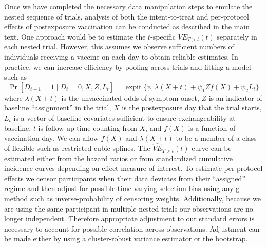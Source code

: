 \begin{appendix}
    Once we have completed the necessary data manipulation steps to emulate the nested sequence of trials, analysis of both the intent-to-treat and per-protocol effects of postexposure vaccination can be conducted as described in the main text. One approach would be to estimate the $t$-specific $VE_{T > t}(t)$ separately in each nested trial. However, this assumes we observe sufficient numbers of individuals receiving a vaccine on each day to obtain reliable estimates. In practice, we can increase efficiency by pooling across trials and fitting a model such as
    \begin{equation}\Pr[D_{t+1} = 1 \mid D_t = 0, X, Z, L_t] =  \operatorname{expit}\{\psi_0 \lambda(X + t) + \psi_1 Z f(X) + \psi_2 L_t\}
    \end{equation}\label{eqn:fixed}
    where $\lambda(X + t)$ is the unvaccinated odds of symptom onset,  $Z$ is an indicator of baseline ``assignment'' in the trial, $X$ is the postexposure day that the trial starts, $L_t$ is a vector of baseline covariates sufficient to ensure exchangeability at baseline, $t$ is follow up time counting from $X$, and $f(X)$ is a function of vaccination day. We can allow $f(X)$ and $\lambda(X + t)$ to be a member of a class of flexible such as restricted cubic splines. The $\widehat{VE}_{T > t}(t)$ curve can be estimated either from the hazard ratios or from standardized cumulative incidence curves depending on effect measure of interest. To estimate per protocol effects we censor participants when their data deviates from their ``assigned'' regime and then adjust for possible time-varying selection bias using any g-method such as inverse-probability of censoring weights. Additionally, because we are using the same participant in multiple nested trials our observations are no longer independent. Therefore appropriate adjustment to our standard errors is necessary to account for possible correlation across observations. Adjustment can be made either by using a cluster-robust variance estimator or the bootstrap. 


\end{appendix}
